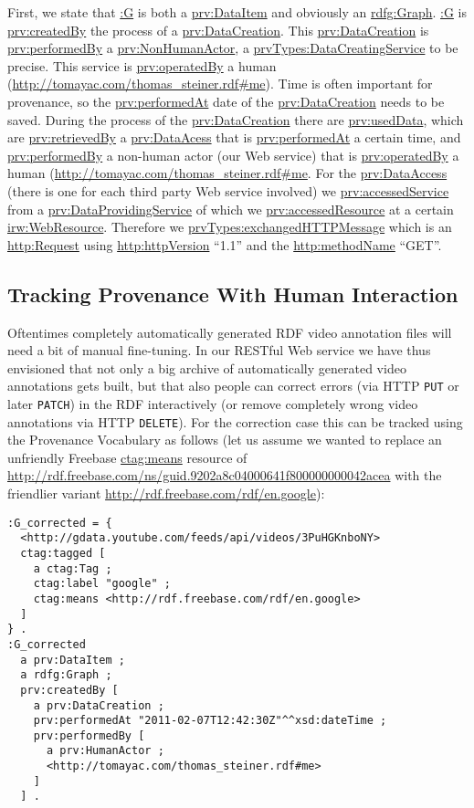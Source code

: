 \documentclass{acm_proc_article-sp}
\begin{document}
First, we state that \url{:G} is both a \url{prv:DataItem} and obviously an \url{rdfg:Graph}. \url{:G} is \url{prv:createdBy} the process of a \url{prv:DataCreation}. This \url{prv:DataCreation} is \url{prv:performedBy} a \url{prv:NonHumanActor}, a 
\url{prvTypes:DataCreatingService} to be precise. This service is \url{prv:operatedBy} a human (\url{http://tomayac.com/thomas_steiner.rdf#me}). Time is often important for provenance, so the \url{prv:performedAt} date of the \url{prv:DataCreation} needs to be saved. During the process of the \url{prv:DataCreation} there are \url{prv:usedData}, which are \url{prv:retrievedBy} a \url{prv:DataAcess} that is \url{prv:performedAt} a certain time, and \url{prv:performedBy} a non-human actor (our Web service) that is \url{prv:operatedBy} a human (\url{http://tomayac.com/thomas_steiner.rdf#me}. For the \url{prv:DataAccess} (there is one for each third party Web service involved) we \url{prv:accessedService} from a \url{prv:DataProvidingService} of which we \url{prv:accessedResource} at a certain \url{irw:WebResource}. Therefore we \url{prvTypes:exchangedHTTPMessage} which is an \url{http:Request} using \url{http:httpVersion} ``1.1'' and the \url{http:methodName} ``GET''.

\subsection{Tracking Provenance With Human Interaction}\label{sec:human}
Oftentimes completely automatically generated RDF video annotation files will need a bit of manual fine-tuning. In our RESTful Web service we have thus envisioned that not only a big archive of automatically generated video annotations gets built, but that also people can correct errors (via HTTP \texttt{PUT} or later \texttt{PATCH}) in the RDF interactively (or remove completely wrong video annotations via HTTP \texttt{DELETE}). For the correction case this can be tracked using the Provenance Vocabulary as follows (let us assume we wanted to replace an unfriendly Freebase \url{ctag:means} resource of \url{http://rdf.freebase.com/ns/guid.9202a8c04000641f800000000042acea} with the friendlier variant \url{http://rdf.freebase.com/rdf/en.google}):
\begin{lstlisting}
:G_corrected = {
  <http://gdata.youtube.com/feeds/api/videos/3PuHGKnboNY> 
  ctag:tagged [
    a ctag:Tag ;
    ctag:label "google" ;
    ctag:means <http://rdf.freebase.com/rdf/en.google> 
  ]  
} .
:G_corrected
  a prv:DataItem ;
  a rdfg:Graph ;
  prv:createdBy [
    a prv:DataCreation ;
    prv:performedAt "2011-02-07T12:42:30Z"^^xsd:dateTime ;
    prv:performedBy [
      a prv:HumanActor ;
      <http://tomayac.com/thomas_steiner.rdf#me> 
    ] 
  ] .
\end{lstlisting}
\end{document}
